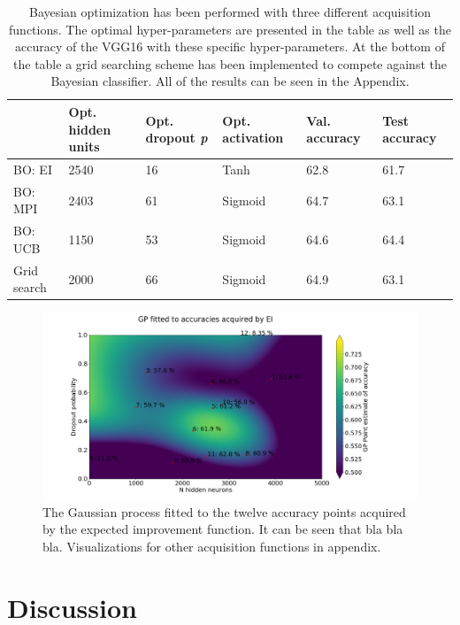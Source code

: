 \documentclass[12pt,fleqn]{article}
\begin{document}
\begin{table}[H]\label{resultater}
	\begin{tabular}{l|lllll}
		  & Opt. hidden units & Opt. dropout \textit{p} & Opt. activation & Val. accuracy &Test accuracy \\ \hline
		BO: EI  & 2540      & 16\pro              & Tanh             &    62.8\pro & 61.7\pro   \\ 
		BO: MPI & 2403         & 61\pro             & Sigmoid             & 64.7\pro  & 63.1\pro     \\ 
		BO: UCB & 1150         & 53\pro              & Sigmoid             & 64.6\pro  & 64.4\pro     \\ 
		Grid search & 2000         & 66\pro              & Sigmoid             & 64.9\pro & 63.1\pro          \\
	\end{tabular}
\caption{Bayesian optimization has been performed with three different acquisition functions. The optimal hyper-parameters are presented in the table as well as the accuracy of the VGG16 with these specific hyper-parameters. At the bottom of the table a grid searching scheme has been implemented to compete against the Bayesian classifier. All of the results can be seen in the Appendix. }
\end{table}
\begin{figure}[H]
	\centering

	\includegraphics[width=\textwidth]{EIGP}	

\caption{The Gaussian process fitted to the twelve accuracy points acquired by the expected improvement function. It can be seen that bla bla bla. Visualizations for other acquisition functions in appendix.}
\end{figure}
\section{Discussion}
\end{document}
